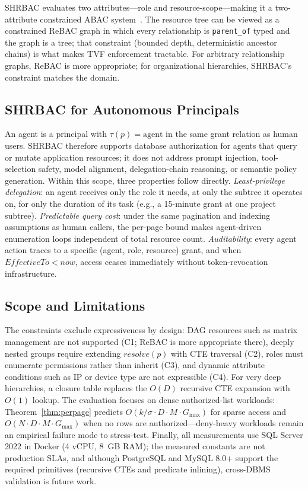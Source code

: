 \documentclass[conference]{IEEEtran}
\begin{document}
SHRBAC evaluates two attributes---role and resource-scope---making it a two-attribute constrained ABAC system~\cite{abac-nist}. The resource tree can be viewed as a constrained ReBAC graph in which every relationship is \texttt{parent\_of} typed and the graph is a tree; that constraint (bounded depth, deterministic ancestor chains) is what makes TVF enforcement tractable. For arbitrary relationship graphs, ReBAC is more appropriate; for organizational hierarchies, SHRBAC's constraint matches the domain.

\subsection{SHRBAC for Autonomous Principals}

An agent is a principal with $\tau(p) = \text{agent}$ in the same grant relation as human users. SHRBAC therefore supports database authorization for agents that query or mutate application resources; it does not address prompt injection, tool-selection safety, model alignment, delegation-chain reasoning, or semantic policy generation. Within this scope, three properties follow directly. \emph{Least-privilege delegation}: an agent receives only the role it needs, at only the subtree it operates on, for only the duration of its task (e.g., a 15-minute grant at one project subtree). \emph{Predictable query cost}: under the same pagination and indexing assumptions as human callers, the per-page bound makes agent-driven enumeration loops independent of total resource count. \emph{Auditability}: every agent action traces to a specific (agent, role, resource) grant, and when $\mathit{EffectiveTo} < \mathit{now}$, access ceases immediately without token-revocation infrastructure.

\subsection{Scope and Limitations}

The constraints exclude expressiveness by design: DAG resources such as matrix management are not supported (C1; ReBAC is more appropriate there), deeply nested groups require extending $\mathit{resolve}(p)$ with CTE traversal (C2), roles must enumerate permissions rather than inherit (C3), and dynamic attribute conditions such as IP or device type are not expressible (C4). For very deep hierarchies, a closure table replaces the $O(D)$ recursive CTE expansion with $O(1)$ lookup. The evaluation focuses on dense authorized-list workloads: Theorem~\ref{thm:perpage} predicts $O(k/\sigma \cdot D \cdot M \cdot G_{\max})$ for sparse access and $O(N \cdot D \cdot M \cdot G_{\max})$ when no rows are authorized---deny-heavy workloads remain an empirical failure mode to stress-test. Finally, all measurements use SQL Server 2022 in Docker (4 vCPU, 8~GB RAM); the measured constants are not production SLAs, and although PostgreSQL and MySQL 8.0+ support the required primitives (recursive CTEs and predicate inlining), cross-DBMS validation is future work.
\end{document}

